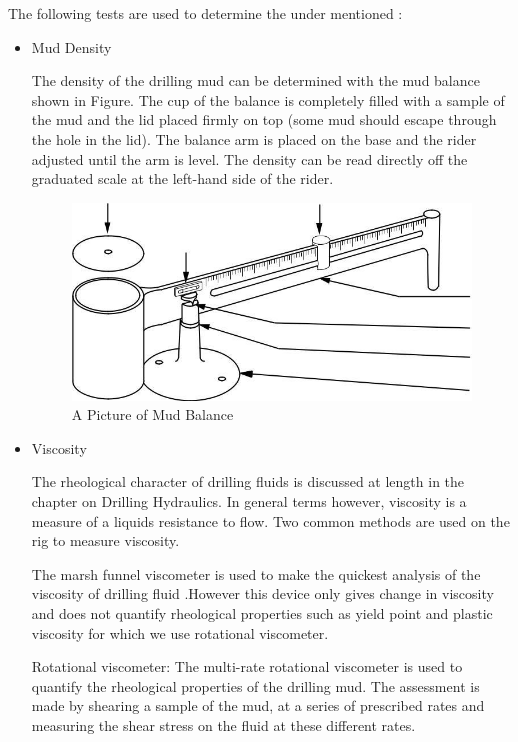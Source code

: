 The following tests are used to determine the under mentioned :
\begin{itemize}

\item Mud Density

The density of the drilling mud can be determined with the mud balance shown 
in Figure. The cup of the balance is completely filled with a sample of the
mud and the lid placed firmly on top (some mud should escape through the hole 
in the lid). The balance arm is placed on the base and the rider adjusted until 
the arm is level. The density can be read directly off the graduated scale at 
the left-hand side of the rider.


\begin{figure}[h]
\includegraphics[scale=0.3]{images/mudbalance}
\centering 
\caption{A Picture of Mud Balance}
\end{figure}

\item Viscosity

The rheological character of drilling fluids is discussed at length in the 
chapter on Drilling Hydraulics. In general terms however, viscosity is a 
measure of a liquids resistance to flow. Two common methods are used on the rig 
to measure viscosity.

The marsh funnel viscometer is used to make the quickest analysis of the 
viscosity of drilling fluid .However this device only gives change in 
viscosity and does not quantify rheological properties such as yield point 
and plastic viscosity for which we use rotational viscometer.

Rotational viscometer: The multi-rate rotational viscometer is used
to quantify the rheological properties of the drilling mud. The
assessment is made by shearing a sample of the mud, at a series of
prescribed rates and measuring the shear stress on the fluid at these
different rates.


\end{itemize}
